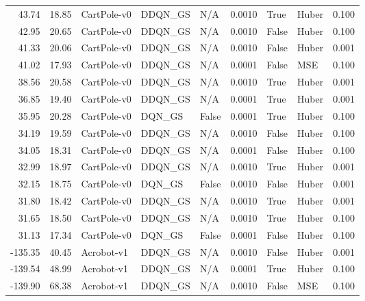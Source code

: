\begin{tabular}{rrlllrllr}
  43.74 &   18.85 &     CartPole-v0 &  DDQN\_GS &    N/A &  0.0010 &       True &         Huber &         0.100 \\
  42.95 &   20.65 &     CartPole-v0 &  DDQN\_GS &    N/A &  0.0010 &      False &         Huber &         0.100 \\
  41.33 &   20.06 &     CartPole-v0 &  DDQN\_GS &    N/A &  0.0010 &      False &         Huber &         0.001 \\
  41.02 &   17.93 &     CartPole-v0 &  DDQN\_GS &    N/A &  0.0001 &      False &           MSE &         0.100 \\
  38.56 &   20.58 &     CartPole-v0 &  DDQN\_GS &    N/A &  0.0010 &       True &         Huber &         0.001 \\
  36.85 &   19.40 &     CartPole-v0 &  DDQN\_GS &    N/A &  0.0001 &       True &         Huber &         0.001 \\
  35.95 &   20.28 &     CartPole-v0 &   DQN\_GS &  False &  0.0001 &       True &         Huber &         0.100 \\
  34.19 &   19.59 &     CartPole-v0 &  DDQN\_GS &    N/A &  0.0010 &      False &         Huber &         0.100 \\
  34.05 &   18.31 &     CartPole-v0 &  DDQN\_GS &    N/A &  0.0001 &      False &         Huber &         0.100 \\
  32.99 &   18.97 &     CartPole-v0 &  DDQN\_GS &    N/A &  0.0010 &       True &         Huber &         0.001 \\
  32.15 &   18.75 &     CartPole-v0 &   DQN\_GS &  False &  0.0010 &      False &         Huber &         0.001 \\
  31.80 &   18.42 &     CartPole-v0 &  DDQN\_GS &    N/A &  0.0010 &       True &         Huber &         0.001 \\
  31.65 &   18.50 &     CartPole-v0 &  DDQN\_GS &    N/A &  0.0010 &       True &         Huber &         0.100 \\
  31.13 &   17.34 &     CartPole-v0 &   DQN\_GS &  False &  0.0001 &      False &         Huber &         0.100 \\
-135.35 &   40.45 &      Acrobot-v1 &  DDQN\_GS &    N/A &  0.0010 &      False &         Huber &         0.001 \\
-139.54 &   48.99 &      Acrobot-v1 &  DDQN\_GS &    N/A &  0.0001 &       True &         Huber &         0.100 \\
-139.90 &   68.38 &      Acrobot-v1 &  DDQN\_GS &    N/A &  0.0010 &      False &           MSE &         0.100 \\

\end{tabular}
